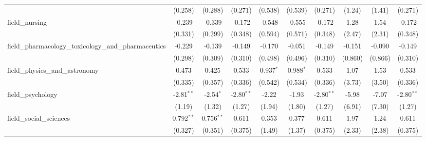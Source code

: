 \begin{tabular}{lccccccccc}
                                                               & (0.258)        & (0.288)        & (0.271)       & (0.538)        & (0.539)        & (0.271)       & (1.24)       & (1.41)      & (0.271)\\   
   field\_nursing                                              & -0.239         & -0.339         & -0.172        & -0.548         & -0.555         & -0.172        & 1.28         & 1.54        & -0.172\\   
                                                               & (0.331)        & (0.299)        & (0.348)       & (0.594)        & (0.571)        & (0.348)       & (2.47)       & (2.31)      & (0.348)\\   
   field\_pharmacology\_toxicology\_and\_pharmaceutics         & -0.229         & -0.139         & -0.149        & -0.170         & -0.051         & -0.149        & -0.151       & -0.090      & -0.149\\   
                                                               & (0.298)        & (0.309)        & (0.310)       & (0.498)        & (0.496)        & (0.310)       & (0.860)      & (0.866)     & (0.310)\\   
   field\_physics\_and\_astronomy                              & 0.473          & 0.425          & 0.533         & 0.937$^{*}$    & 0.988$^{*}$    & 0.533         & 1.07         & 1.53        & 0.533\\   
                                                               & (0.335)        & (0.357)        & (0.336)       & (0.542)        & (0.534)        & (0.336)       & (3.73)       & (3.50)      & (0.336)\\   
   field\_psychology                                           & -2.81$^{**}$   & -2.54$^{*}$    & -2.80$^{**}$  & -2.22          & -1.93          & -2.80$^{**}$  & -5.98        & -7.07       & -2.80$^{**}$\\   
                                                               & (1.19)         & (1.32)         & (1.27)        & (1.94)         & (1.80)         & (1.27)        & (6.91)       & (7.30)      & (1.27)\\   
   field\_social\_sciences                                     & 0.792$^{**}$   & 0.756$^{**}$   & 0.611         & 0.353          & 0.377          & 0.611         & 1.97         & 1.24        & 0.611\\   
                                                               & (0.327)        & (0.351)        & (0.375)       & (1.49)         & (1.37)         & (0.375)       & (2.33)       & (2.38)      & (0.375)\\   

\end{tabular}
